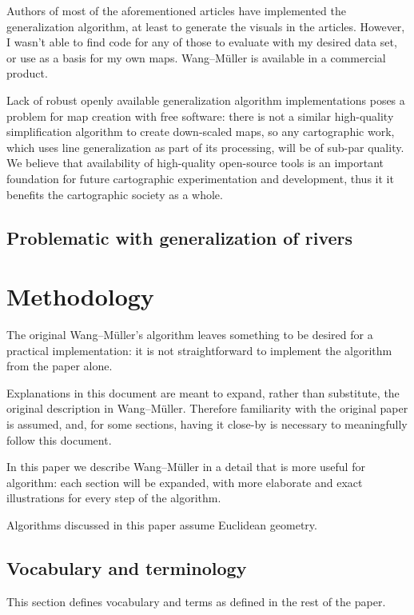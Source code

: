 \documentclass[a4paper]{article}
\newcommand{\WM}{Wang--M{\"u}ller}
\begin{document}
Authors of most of the aforementioned articles have implemented the
generalization algorithm, at least to generate the visuals in the articles.
However, I wasn't able to find code for any of those to evaluate with my
desired data set, or use as a basis for my own maps. {\WM} \cite{wang1998line}
is available in a commercial product.

Lack of robust openly available generalization algorithm implementations poses
a problem for map creation with free software: there is not a similar
high-quality simplification algorithm to create down-scaled maps, so any
cartographic work, which uses line generalization as part of its processing,
will be of sub-par quality. We believe that availability of high-quality
open-source tools is an important foundation for future cartographic
experimentation and development, thus it it benefits the cartographic society
as a whole.

\subsection{Problematic with generalization of rivers}

\section{Methodology}
\label{sec:methodology}

The original {\WM}'s algorithm \cite{wang1998line} leaves something to be
desired for a practical implementation: it is not straightforward to implement
the algorithm from the paper alone.

Explanations in this document are meant to expand, rather than substitute, the
original description in {\WM}. Therefore familiarity with the original paper is
assumed, and, for some sections, having it close-by is necessary to
meaningfully follow this document.

In this paper we describe {\WM} in a detail that is more useful for algorithm:
each section will be expanded, with more elaborate and exact illustrations for
every step of the algorithm.

Algorithms discussed in this paper assume Euclidean geometry.

\subsection{Vocabulary and terminology}

This section defines vocabulary and terms as defined in the rest of the paper.
\end{document}
